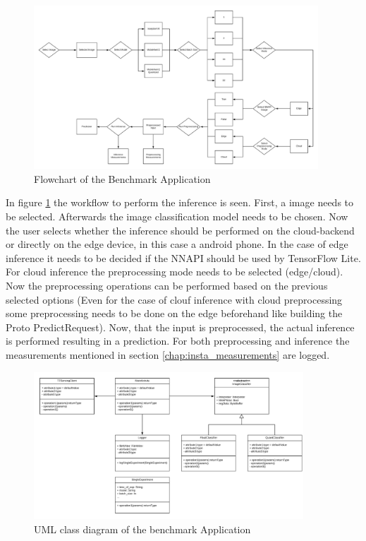 \begin{figure}[H]
\centering
\includegraphics[width=0.95\textwidth]{./Bilder/FlowChart_App.png}
\caption{Flowchart of the Benchmark Application}
\label{fig:app}
\end{figure}
In figure \ref{fig:app} the workflow to perform the inference is seen. First, a image needs to be selected. Afterwards the image classification model needs to be chosen. Now the user selects whether the inference should be performed on the cloud-backend or directly on the edge device, in this case a android phone. In the case of edge inference it needs to be decided if the NNAPI should be used by TensorFlow Lite. For cloud inference the preprocessing mode needs to be selected (edge/cloud). Now the preprocessing operations can be performed based on the previous selected options (Even for the case of clouf inference with cloud preprocessing some preprocessing needs to be done on the edge beforehand like building the Proto PredictRequest). Now, that the input is preprocessed, the actual inference is performed resulting in a prediction. For both preprocessing and inference the measurements mentioned in section \ref{chap:insta_measurements} are logged.

\begin{figure}[H]
\centering
\includegraphics[width=0.9\textwidth]{./Bilder/UML.png}
\caption{UML class diagram of the benchmark Application}
\label{fig:UML}
\end{figure}
